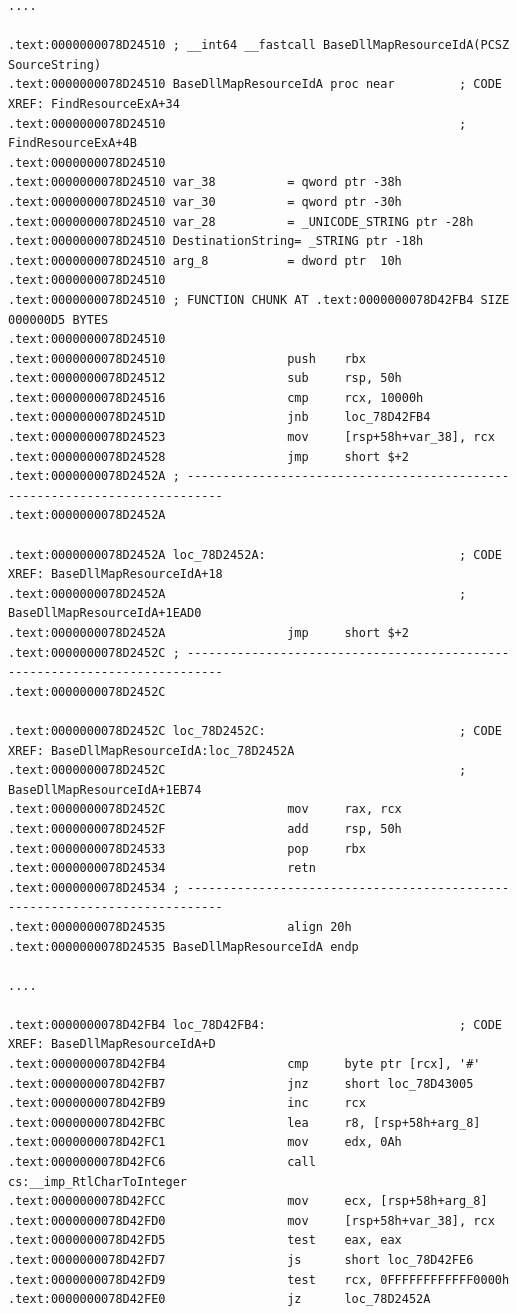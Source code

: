 \begin{lstlisting}[style=customasmx86]
....

.text:0000000078D24510 ; __int64 __fastcall BaseDllMapResourceIdA(PCSZ SourceString)
.text:0000000078D24510 BaseDllMapResourceIdA proc near         ; CODE XREF: FindResourceExA+34
.text:0000000078D24510                                         ; FindResourceExA+4B
.text:0000000078D24510
.text:0000000078D24510 var_38          = qword ptr -38h
.text:0000000078D24510 var_30          = qword ptr -30h
.text:0000000078D24510 var_28          = _UNICODE_STRING ptr -28h
.text:0000000078D24510 DestinationString= _STRING ptr -18h
.text:0000000078D24510 arg_8           = dword ptr  10h
.text:0000000078D24510
.text:0000000078D24510 ; FUNCTION CHUNK AT .text:0000000078D42FB4 SIZE 000000D5 BYTES
.text:0000000078D24510
.text:0000000078D24510                 push    rbx
.text:0000000078D24512                 sub     rsp, 50h
.text:0000000078D24516                 cmp     rcx, 10000h
.text:0000000078D2451D                 jnb     loc_78D42FB4
.text:0000000078D24523                 mov     [rsp+58h+var_38], rcx
.text:0000000078D24528                 jmp     short $+2
.text:0000000078D2452A ; ---------------------------------------------------------------------------
.text:0000000078D2452A

.text:0000000078D2452A loc_78D2452A:                           ; CODE XREF: BaseDllMapResourceIdA+18
.text:0000000078D2452A                                         ; BaseDllMapResourceIdA+1EAD0
.text:0000000078D2452A                 jmp     short $+2
.text:0000000078D2452C ; ---------------------------------------------------------------------------
.text:0000000078D2452C

.text:0000000078D2452C loc_78D2452C:                           ; CODE XREF: BaseDllMapResourceIdA:loc_78D2452A
.text:0000000078D2452C                                         ; BaseDllMapResourceIdA+1EB74
.text:0000000078D2452C                 mov     rax, rcx
.text:0000000078D2452F                 add     rsp, 50h
.text:0000000078D24533                 pop     rbx
.text:0000000078D24534                 retn
.text:0000000078D24534 ; ---------------------------------------------------------------------------
.text:0000000078D24535                 align 20h
.text:0000000078D24535 BaseDllMapResourceIdA endp

....

.text:0000000078D42FB4 loc_78D42FB4:                           ; CODE XREF: BaseDllMapResourceIdA+D
.text:0000000078D42FB4                 cmp     byte ptr [rcx], '#'
.text:0000000078D42FB7                 jnz     short loc_78D43005
.text:0000000078D42FB9                 inc     rcx
.text:0000000078D42FBC                 lea     r8, [rsp+58h+arg_8]
.text:0000000078D42FC1                 mov     edx, 0Ah
.text:0000000078D42FC6                 call    cs:__imp_RtlCharToInteger
.text:0000000078D42FCC                 mov     ecx, [rsp+58h+arg_8]
.text:0000000078D42FD0                 mov     [rsp+58h+var_38], rcx
.text:0000000078D42FD5                 test    eax, eax
.text:0000000078D42FD7                 js      short loc_78D42FE6
.text:0000000078D42FD9                 test    rcx, 0FFFFFFFFFFFF0000h
.text:0000000078D42FE0                 jz      loc_78D2452A


\end{lstlisting}
